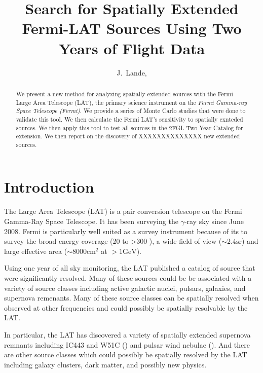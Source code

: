 \documentclass[preprint]{aastex}
\newcommand{\mev}{\text{MeV}\xspace}
\newcommand{\gev}{\text{GeV}\xspace}
\newcommand{\sr}{\text{sr}\xspace}
\newcommand{\cm}{\text{cm}\xspace}
\begin{document}
\title{Search for Spatially Extended Fermi-LAT Sources Using Two Years of Flight
Data}

\author{
J.~Lande, 
}


\begin{abstract}
We present a new method for analyzing spatially extended sources with
the Fermi Large Area Telescope (LAT), the primary science instrument
on the {\em Fermi Gamma-ray Space Telescope (Fermi)}.  We provide a
series of Monte Carlo studies that were done to validate this tool.
We then calculate the Fermi LAT's sensitivity to spatially exnteded
sources.  We then apply this tool to test all sources in the 2FGL Two
Year Catalog for extension.\cite{second_cat} We then report on the discovery
of XXXXXXXXXXXXXX new extended sources.
\end{abstract}

\section{Introduction}


The Large Area Telescope (LAT) is a pair conversion telescope on the
Fermi Gamma-Ray Space Telescope. It has been surveying the $\gamma$-ray
sky since June 2008.  Fermi is particularly well suited as a survey
instrument because of its to survey the broad energy coverage (20 \mev
to >300 \gev), a wide field of view ($\sim 2.4 \sr$) and large effective
area ($\sim 8000 \cm^2$ at $>1 \gev$).

Using one year of all sky monitoring, the LAT published a catalog of
source that were significantly resolved.  Many of these sources could
be be associated with a variety of source classes including active
galactic nuclei, pulsars, galaxies, and supernova remenants.  Many of
these source classes can be spatially resolved when observed at other
frequencies and could possibly be spatially resolvable by the LAT.

In particular, the LAT has discovered a variety of spatially extended
supernova remnants including IC443 and W51C (\cite{ic443,w51c}) and pulsar
wind nebulae (\cite{msh1552,velax}). And there are other source classes
which could possibly be spatially resolved by the LAT including galaxy
clusters, dark matter, and possibly new physics.
\end{document}

